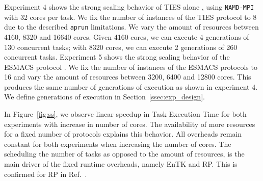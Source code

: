 Experiment 4  shows the strong scaling behavior 
of TIES alone 
, using \texttt{NAMD-MPI} with 32
cores per task. We fix the number of instances of the TIES protocol to 8 due
to the described \texttt{aprun} limitations. We vary the amount of resources
between 4160, 8320 and 16640 cores. Given 4160 cores, we can execute 4
generations of 130 concurrent tasks; with 8320 cores, we can execute 2
generations of 260 concurrent tasks. Experiment 5 shows the strong scaling 
behavior of the ESMACS protocol . We fix the number of instances of the 
ESMACS protocols to 16 and vary the amount of resources between 3200, 6400 and 
12800 cores. This produces the same number of generations of execution 
 as shown in 
experiment 4. We define generations of execution in Section~\ref{ssec:exp_design}. 

In Figure~\ref{fig:ss}, we observe linear speedup in Task Execution Time for
both experiments with increase in number of cores. The availability of more 
resources for a fixed number of protocols explains this behavior. All overheads 
remain constant for both experiments when increasing the number 
of cores. The scheduling the number of tasks as opposed to the amount of 
resources, is the main driver of the fixed runtime overheads, namely EnTK and 
RP. This is confirmed for RP in Ref.~\cite{merzky2018}.





